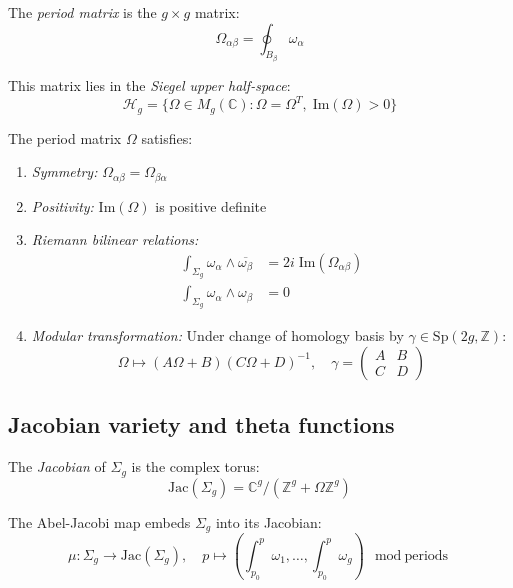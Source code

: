 \begin{definition}
\label{def:period-matrix}
The \emph{period matrix} is the $g \times g$ matrix:
\begin{equation}
\Omega_{\alpha\beta} = \oint_{B_\beta} \omega_\alpha
\end{equation}

This matrix lies in the \emph{Siegel upper half-space}:
\begin{equation}
\mathcal{H}_g = \{\Omega \in M_g(\mathbb{C}) : \Omega = \Omega^T, \; \text{Im}(\Omega) > 0\}
\end{equation}
\end{definition}

\begin{theorem}
\label{thm:period-matrix-properties}
The period matrix $\Omega$ satisfies:
\begin{enumerate}
\item \emph{Symmetry:} $\Omega_{\alpha\beta} = \Omega_{\beta\alpha}$
\item \emph{Positivity:} $\text{Im}(\Omega)$ is positive definite
\item \emph{Riemann bilinear relations:}
\begin{align}
\int_{\Sigma_g} \omega_\alpha \wedge \overline{\omega_\beta} &= 2i \; \text{Im}(\Omega_{\alpha\beta})\\
\int_{\Sigma_g} \omega_\alpha \wedge \omega_\beta &= 0
\end{align}
\item \emph{Modular transformation:} Under change of homology basis by $\gamma \in \text{Sp}(2g, \mathbb{Z})$:
\begin{equation}
\Omega \mapsto (A\Omega + B)(C\Omega + D)^{-1}, \quad \gamma = \begin{pmatrix} A & B \\ C & D \end{pmatrix}
\end{equation}
\end{enumerate}
\end{theorem}

\subsection{Jacobian variety and theta functions}

\begin{definition}
\label{def:jacobian-variety}
The \emph{Jacobian} of $\Sigma_g$ is the complex torus:
\begin{equation}
\text{Jac}(\Sigma_g) = \mathbb{C}^g / (\mathbb{Z}^g + \Omega \mathbb{Z}^g)
\end{equation}

The Abel-Jacobi map embeds $\Sigma_g$ into its Jacobian:
\begin{equation}
\mu: \Sigma_g \to \text{Jac}(\Sigma_g), \quad p \mapsto \left(\int_{p_0}^p \omega_1, \ldots, \int_{p_0}^p \omega_g\right) \mod \text{periods}
\end{equation}
\end{definition}


